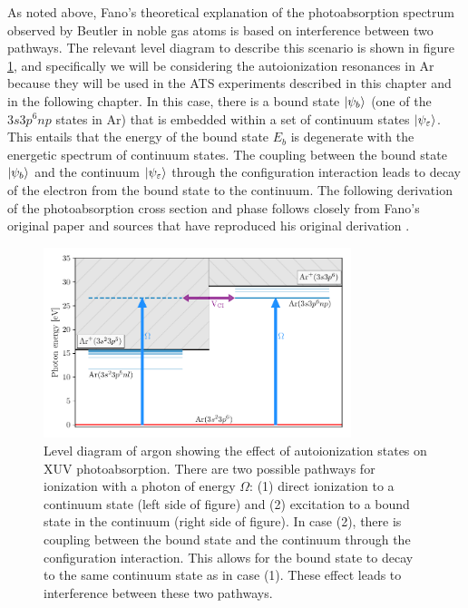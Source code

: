 As noted above, Fano's theoretical explanation of the photoabsorption spectrum observed by Beutler in noble gas atoms is based on interference between two pathways.  The relevant level diagram to describe this scenario is shown in figure \ref{fig:fano_level_diagram}, and specifically we will be considering the autoionization resonances in Ar because they will be used in the ATS experiments described in this chapter and in the following chapter.  In this case, there is a bound state $\ket{\psi_b}$ (one of the $3s3p^6np$ states in Ar) that is embedded within a set of continuum states $\ket{\psi_\varepsilon}$.  This entails that the energy of the bound state $E_b$ is degenerate with the energetic spectrum of continuum states. The coupling between the bound state $\ket{\psi_b}$ and the continuum $\ket{\psi_\varepsilon}$ through the configuration interaction leads to decay of the electron from the bound state to the continuum.  The following derivation of the photoabsorption cross section and phase follows closely from Fano's original paper and sources that have reproduced his original derivation \cite{fanoEffectsConfigurationInteraction1961, changFundamentalsAttosecondOptics2011, ottAttosecondMultidimensionalInterferometry2012}.

\begin{figure}
	\centering
	\includegraphics[width=0.8\textwidth]{figures/ATS/fano_level_diagram.pdf}
	\caption[Level diagram of Fano resonances in Argon]{Level diagram of argon showing the effect of autoionization states on XUV photoabsorption. There are two possible pathways for ionization with a photon of energy $\Omega$: (1) direct ionization to a continuum state (left side of figure) and (2) excitation to a bound state in the continuum (right side of figure).  In case (2), there is coupling between the bound state and the continuum through the configuration interaction.  This allows for the bound state to decay to the same continuum state as in case (1).  These effect leads to interference between these two pathways.}
	\label{fig:fano_level_diagram}
\end{figure}

